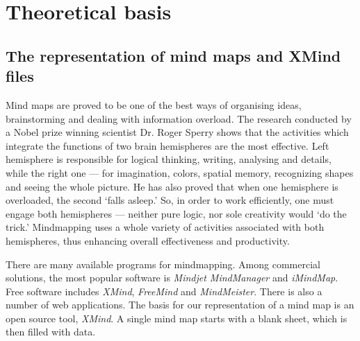 %
%
%
%
%

\chapter{Theoretical basis}
\label{chap:theory}

\section{The representation of mind maps and XMind files}
\label{sec:xmind}

Mind maps are proved to be one of the best ways of organising ideas, brainstorming and dealing with information overload. The research conducted by a Nobel prize winning scientist Dr. Roger Sperry shows that the activities which integrate the functions of two brain hemispheres are the most effective. Left hemisphere is responsible for logical thinking, writing, analysing and details, while the right one --- for imagination, colors, spatial memory, recognizing shapes and seeing the whole picture. He has also proved that when one hemisphere is overloaded, the second `falls asleep.' So, in order to work efficiently, one must engage both hemispheres --- neither pure logic, nor sole creativity would `do the trick.' Mindmapping uses a whole variety of activities associated with both hemispheres, thus enhancing overall effectiveness and productivity.

There are many available programs for mindmapping. Among commercial solutions, the most popular software is {\em Mindjet MindManager} and {\em iMindMap}. Free software includes {\em XMind}, {\em FreeMind} and \emph{MindMeister}. There is also a number of web applications. The basis for our representation of a mind map is an open source tool, {\em XMind}. A single mind map starts with a blank sheet, which is then filled with data.

